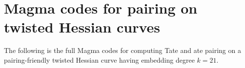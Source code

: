 \section{Magma codes for pairing on twisted Hessian curves}
\label{app:magma}
The following is the full Magma codes for computing Tate and ate pairing
on a pairing-friendly twisted Hessian curve having embedding degree $k = 21$.

